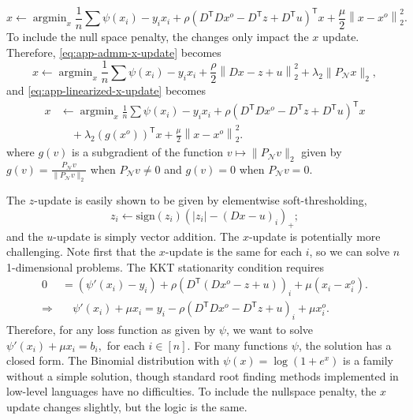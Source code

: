 \documentclass[ejs,noshowframe]{imsart}
\theoremstyle{plain}
\theoremstyle{definition}
\DeclareMathOperator*{\argmin}{argmin}
\newcommand{\cN}{\mathcal{N}}
\renewcommand{\top}{\mathsf{T}}
\begin{document}
\begin{appendix}
\begin{equation}
	\label{eq:app-linearized-x-update}
	x \leftarrow \argmin_x \frac{1}{n}\sum \psi(x_i) - y_i x_i +
	\rho \left(D^\top D x^o - D^\top z + D^\top u\right)^\top x +
	\frac{\mu}{2}\left\lVert x-x^o \right\rVert_2^2.
\end{equation}
To include the null space penalty,
the changes only impact the $x$ update. Therefore, \eqref{eq:app-admm-x-update} 
becomes
\begin{equation}
	x \leftarrow \argmin_x \frac{1}{n}\sum \psi(x_i) - y_i x_i +
	\frac{\rho}{2}\left\lVert Dx-z+u\right\rVert_2^2 + \lambda_2 \|
	P_\cN x \|_2, 
\end{equation}
and \eqref{eq:app-linearized-x-update} 
becomes
\begin{align}
x &\leftarrow \argmin_x\frac{1}{n}\sum \psi(x_i) - y_i x_i + \rho \left(D^\top D 
x^o -
D^\top z + D^\top u\right)^\top x\\ 
&\quad +\lambda_2 (g(x^o))^\top x +
\frac{\mu}{2}\left\lVert x-x^o \right\rVert_2^2. 
\end{align}
where $g(v)$ is a subgradient of the function $v \mapsto \|P_\cN v\|_2$ given by
$g(v) = \frac{P_\cN v}{\| P_\cN v\|_2}$ when $P_\cN v \neq 0$ and 
$g(v) = 0$ when $P_\cN v = 0$.

The $z$-update is easily shown to be given by elementwise soft-thresholding,
$$z_i\leftarrow \textrm{sign}(z_i)\left(|z_i| - (Dx-u)_i\right)_+;$$ 
and the $u$-update is 
simply vector addition. The $x$-update is potentially more challenging.
Note first that the $x$-update is the same for each $i$, so we can solve $n$
1-dimensional problems.  
The KKT stationarity condition requires
\begin{align}
	0 & =\left(\psi'(x_i) - y_i\right)  + \rho \left( D^\top \left(D x^o -
	z+u\right)\right)_i + \mu( x_i-x_i^o).\\
  \Longrightarrow  &\quad\psi'(x_i) + \mu x_i =  y_i  - \rho\left( D^\top D x^o - D^\top
  z+u\right)_i +  \mu x_i^o. 
\end{align}
Therefore, for any loss function as given by $\psi$, we want to solve
$
\psi'(x_i) + \mu x_i = b_i,
$
for each $i\in[n]$. For many functions $\psi$, the solution has a closed form. The
Binomial distribution with $\psi(x) = \log(1+e^x)$ is a family without a
simple solution, though standard root finding methods implemented in low-level
languages have no difficulties.
To include the nullspace penalty, the $x$ update changes slightly, but the
logic is the same.






\end{appendix}
\end{document}
